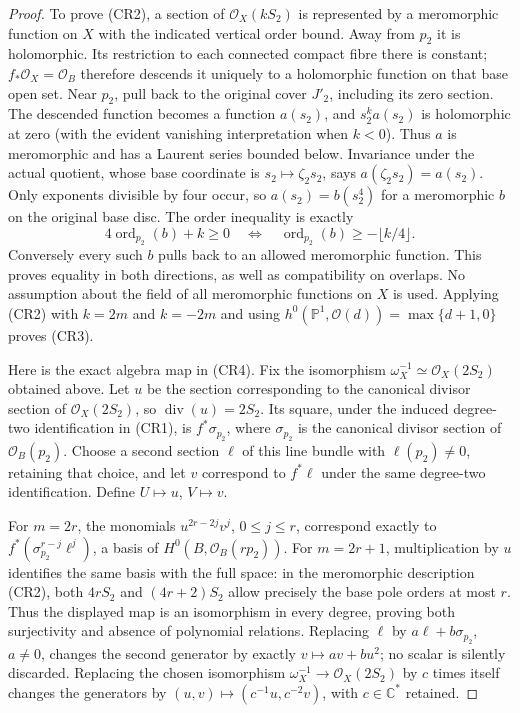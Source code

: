 \begin{proof}
To prove (CR2), a section of $\mathcal O_X(kS_2)$ is represented by
a meromorphic function on $X$ with the indicated vertical order bound.
Away from $p_2$ it is holomorphic. Its restriction to each connected
compact fibre there is constant; $f_*\mathcal O_X=\mathcal O_B$
therefore descends it uniquely to a holomorphic function on that base
open set. Near $p_2$, pull back to the original cover $J'_2$, including
its zero section. The descended function becomes a function $a(s_2)$,
and $s_2^k a(s_2)$ is holomorphic at zero (with the evident vanishing
interpretation when $k<0$). Thus $a$ is meromorphic and has a Laurent
series bounded below. Invariance under the actual quotient, whose base
coordinate is $s_2\mapsto\zeta_2s_2$, says
$a(\zeta_2s_2)=a(s_2)$. Only exponents divisible by four occur, so
$a(s_2)=b(s_2^4)$ for a meromorphic $b$ on the original base disc.
The order inequality is exactly
\[
 4\operatorname{ord}_{p_2}(b)+k\geq0
 \quad\Longleftrightarrow\quad
 \operatorname{ord}_{p_2}(b)\geq-\lfloor k/4\rfloor.
\]
Conversely every such $b$ pulls back to an allowed meromorphic function.
This proves equality in both directions, as well as compatibility on
overlaps. No assumption about the field of all meromorphic functions
on $X$ is used. Applying (CR2) with $k=2m$ and $k=-2m$ and using
$h^0(\mathbb P^1,\mathcal O(d))=\max\{d+1,0\}$ proves (CR3).

Here is the exact algebra map in (CR4). Fix the isomorphism
$\omega_X^{-1}\simeq\mathcal O_X(2S_2)$ obtained above. Let $u$ be
the section corresponding to the canonical divisor section of
$\mathcal O_X(2S_2)$, so $\operatorname{div}(u)=2S_2$.
Its square, under the induced degree-two identification in (CR1),
is $f^*\sigma_{p_2}$, where $\sigma_{p_2}$ is the canonical divisor
section of $\mathcal O_B(p_2)$. Choose a second section $\ell$ of this
line bundle with $\ell(p_2)\ne0$, retaining that choice, and let $v$
correspond to $f^*\ell$ under the same degree-two identification.
Define $U\mapsto u$, $V\mapsto v$.

For $m=2r$, the monomials $u^{2r-2j}v^j$, $0\leq j\leq r$,
correspond exactly to
$f^*(\sigma_{p_2}^{r-j}\ell^j)$, a basis of
$H^0(B,\mathcal O_B(rp_2))$. For $m=2r+1$, multiplication by $u$
identifies the same basis with the full space: in the meromorphic
description (CR2), both $4rS_2$ and $(4r+2)S_2$ allow precisely
the base pole orders at most $r$. Thus the displayed map is an
isomorphism in every degree, proving both surjectivity and absence of
polynomial relations. Replacing $\ell$ by $a\ell+b\sigma_{p_2}$,
$a\ne0$, changes the second generator by exactly
$v\mapsto av+bu^2$; no scalar is silently discarded.
Replacing the chosen isomorphism $\omega_X^{-1}\to\mathcal O_X(2S_2)$
by $c$ times itself changes the generators by
$(u,v)\mapsto(c^{-1}u,c^{-2}v)$, with $c\in\mathbb C^*$ retained.


\end{proof}
